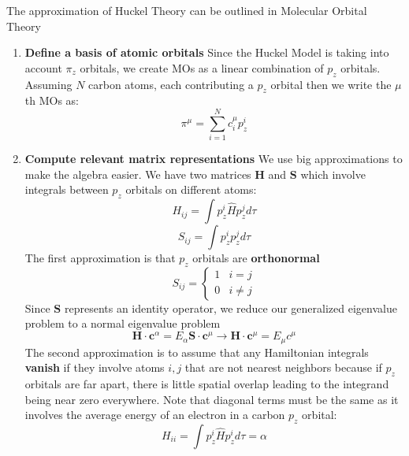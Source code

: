 The approximation of Huckel Theory can be outlined in Molecular Orbital Theory \newline 
\begin{enumerate}
    \item \textbf{Define a basis of atomic orbitals} Since the Huckel Model is taking into account $\pi_{z}$ orbitals, we create MOs as a linear combination of $p_{z}$ orbitals. Assuming $N$ carbon atoms, each contributing a $p_{z}$ orbital then we write the $\mu$th MOs as: 
    \begin{equation}
        \pi^{\mu} = \sum_{i=1}^{N} c_{i}^{\mu}p_{z}^{i}
    \end{equation}
    \item \textbf{Compute relevant matrix representations} We use big approximations to make the algebra easier. We have two matrices $\textbf{H}$ and $\textbf{S}$ which involve integrals between $p_{z}$ orbitals on different atoms:
    \begin{equation}
        H_{ij} = \int p_{z}^{i} \hat{H} p_{z}^{j} d\tau
    \end{equation}
    \begin{equation}
        S_{ij} = \int p_{z}^{i}  p_{z}^{j} d\tau
    \end{equation}
    The first approximation is that $p_{z}$ orbitals are \textbf{orthonormal}
    \begin{equation}
        S_{ij} = \begin{cases}  1 & i=j \\ 0 & i \neq j \end{cases}
    \end{equation}
    Since $\textbf{S}$ represents an identity operator, we reduce our generalized eigenvalue problem to a normal eigenvalue problem 
    \begin{equation}
        \textbf{H} \cdot \textbf{c}^{\alpha} = E_{\alpha} \textbf{S}\cdot \textbf{c}^{\mu} \rightarrow \textbf{H} \cdot \textbf{c}^{\mu} = E_{\mu}c^{\mu} 
    \end{equation}
    The second approximation is to assume that any Hamiltonian integrals \textbf{vanish} if they involve atoms $i,j$ that are not nearest neighbors because if $p_{z}$ orbitals are far apart, there is little spatial overlap leading to the integrand being near zero everywhere. Note that diagonal terms must be the same as it involves the average energy of an electron in a carbon $p_{z}$ orbital:
    \begin{equation}
        H_{ii} = \int p_{z}^{i} \hat{H} p_{z}^{i} d\tau  = \alpha

\end{equation}
\end{enumerate}
